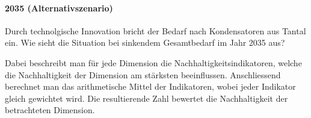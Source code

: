 \paragraph{2035 (Alternativszenario)}
Durch technolgische Innovation bricht der Bedarf nach Kondensatoren aus Tantal ein. Wie sieht die Situation bei sinkendem Gesamtbedarf im Jahr 2035 aus?

Dabei beschreibt man für jede Dimension die Nachhaltigkeitsindikatoren, welche die Nachhaltigkeit der Dimension am stärksten beeinflussen. Anschliessend berechnet man das arithmetische Mittel der Indikatoren, wobei jeder Indikator gleich gewichtet wird.
Die resultierende Zahl bewertet die Nachhaltigkeit der betrachteten Dimension.

